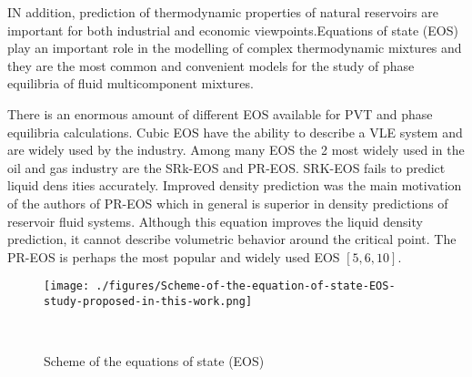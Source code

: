 \documentclass[12pt,a4paper,oneside]{report}%
\begin{document}
IN addition, prediction of thermodynamic properties of natural reservoirs are important for both industrial and economic viewpoints.Equations of state (EOS) play an important role in the modelling of complex thermodynamic mixtures and they are the most common and convenient models for the study of phase equilibria of fluid multicomponent mixtures. 

There is an enormous amount of different EOS available for PVT and phase equilibria calculations. Cubic EOS have the ability to describe a VLE system and are widely used by the industry. Among many EOS the 2 most widely used in the oil and gas industry are the SRk-EOS and PR-EOS.  SRK-EOS fails to predict liquid dens
ities accurately. Improved density prediction was  the  main  motivation  of  the  authors  of  PR-EOS  which  in  general  is  superior  in  density predictions  of  reservoir  fluid  systems.  Although  this  equation  improves  the  liquid  density  
prediction,  it  cannot  describe  volumetric  behavior around  the  critical  point.  The  PR-EOS  is perhaps the most popular and widely used EOS $[5 , 6 , 10]$. 

\begin{figure}[h]
\center
\texttt{[image: ./figures/Scheme-of-the-equation-of-state-EOS-study-proposed-in-this-work.png]}
\caption{Scheme of the equations of state (EOS)}~\label{case1:simple_profile}
\end{figure}




\end{document}
